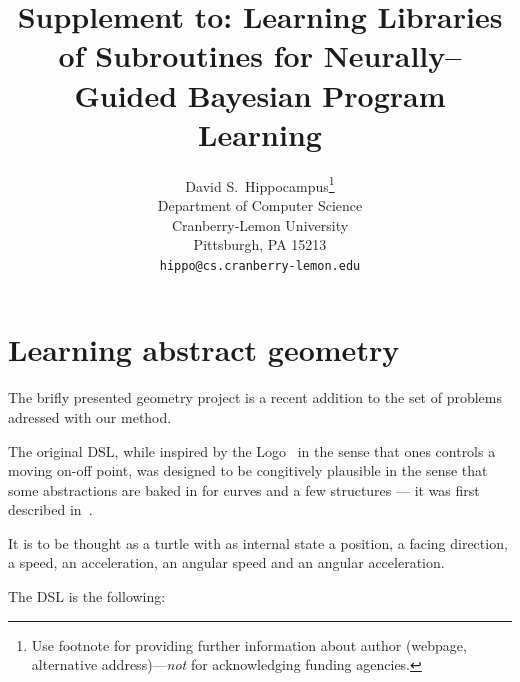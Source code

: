 \documentclass{article}
\title{Supplement to: Learning Libraries of Subroutines for Neurally--Guided Bayesian Program Learning}
\author{
  David S.~Hippocampus\thanks{Use footnote for providing further
    information about author (webpage, alternative
    address)---\emph{not} for acknowledging funding agencies.} \\
  Department of Computer Science\\
  Cranberry-Lemon University\\
  Pittsburgh, PA 15213 \\
  \texttt{hippo@cs.cranberry-lemon.edu} \\
}
\begin{document}

\maketitle

\section{Learning abstract geometry}
The brifly presented geometry project is a recent addition to the set of
problems adressed with our method.

The original DSL, while inspired by the Logo~\cite{abelson1974logo} in the sense
that ones controls a moving on-off point, was designed to be congitively
plausible in the sense that some abstractions are baked in for curves and a few
structures --- it was first described in~\cite{sablemeyer2017geom}.

It is to be thought as a turtle with as internal state a position, a facing
direction, a speed, an acceleration, an angular speed and an angular
acceleration.

The DSL is the following:
\end{document}
